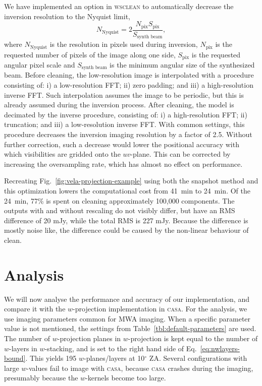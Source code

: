 \documentclass[useAMS,usenatbib]{mn2e}
\newcommand{\degree}{\ensuremath{^{\circ}}\xspace}
\begin{document}
We have implemented an option in \textsc{wsclean} to automatically decrease the inversion resolution to the Nyquist limit,
\begin{equation}\label{eq:nyquist-resolution}
 N_\textrm{Nyquist} = 2 \frac{N_\textrm{pix} S_\textrm{pix}}{S_\textrm{synth beam}},
\end{equation}
where $N_\textrm{Nyquist}$ is the resolution in pixels used during inversion, $N_\textrm{pix}$ is the requested number of pixels of the image along one side, $S_\textrm{pix}$ is the requested angular pixel scale and $S_\textrm{synth beam}$ is the minimum angular size of the synthesized beam. Before cleaning, the low-resolution image is interpolated with a procedure consisting of: i) a low-resolution FFT; ii) zero padding; and iii) a high-resolution inverse FFT. Such interpolation assumes the image to be periodic, but this is already assumed during the inversion process. After cleaning, the model is decimated by the inverse procedure, consisting of: i) a high-resolution FFT; ii) truncation; and iii) a low-resolution inverse FFT. With common settings, this procedure decreases the inversion imaging resolution by a factor of 2.5. Without further correction, such a decrease would lower the positional accuracy with which visibilities are gridded onto the $uv$-plane. This can be corrected by increasing the oversampling rate, which has almost no effect on performance.

Recreating Fig.~\ref{fig:vela-projection-example} using both the snapshot method and this optimization lowers the computational cost from 41~min to 24~min. Of the 24~min, 77\% is spent on cleaning approximately 100,000 components. The outputs with and without rescaling do not visibly differ, but have an RMS difference of 20 mJy, while the total RMS is 227 mJy. Because the difference is mostly noise like, the difference could be caused by the non-linear behaviour of clean.

\section{Analysis} \label{sec:analysis}
We will now analyse the performance and accuracy of our implementation, and compare it with the $w$-projection implementation in \textsc{casa}. For the analysis, we use imaging parameters common for MWA imaging. When a specific parameter value is not mentioned, the settings from Table~\ref{tbl:default-parameters} are used. The number of $w$-projection planes in $w$-projection is kept equal to the number of $w$-layers in $w$-stacking, and is set to the right hand side of Eq.~\eqref{eq:nwlayers-bound}. This yields 195 $w$-planes/layers at 10\degree ZA. Several configurations with large $w$-values fail to image with \textsc{casa}, because \textsc{casa} crashes during the imaging, presumably because the $w$-kernels become too large.
\end{document}
